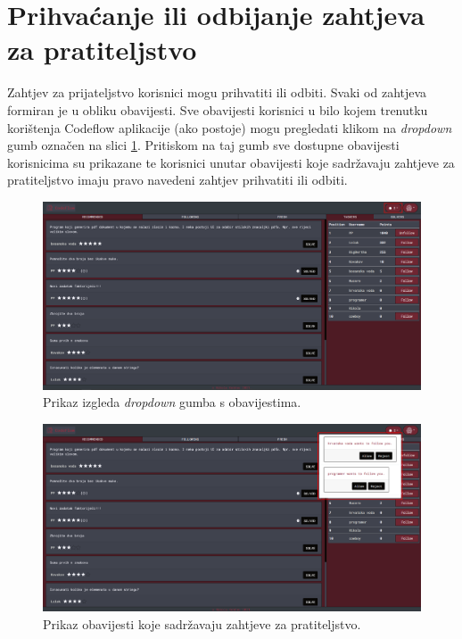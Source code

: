 \documentclass[times, utf8, zavrsni, numeric]{fer}
\begin{document}
		\section{Prihvaćanje ili odbijanje zahtjeva za pratiteljstvo}
		Zahtjev za prijateljstvo korisnici mogu prihvatiti ili odbiti. Svaki od zahtjeva formiran je u obliku obavijesti. Sve obavijesti korisnici u bilo kojem trenutku korištenja Codeflow aplikacije (ako postoje) mogu pregledati klikom na \textit{dropdown} gumb označen na slici \ref{fig:notificationbutton}. Pritiskom na taj gumb sve dostupne obavijesti korisnicima su prikazane te korisnici unutar obavijesti koje sadržavaju zahtjeve za pratiteljstvo imaju pravo navedeni zahtjev prihvatiti ili odbiti.
		\begin{figure}[H]
			\centering
			\includegraphics[width=\linewidth]{pictures/koristenje/GumbZaObavijesti.png}
			\caption{Prikaz izgleda \textit{dropdown} gumba s obavijestima.}
			\label{fig:notificationbutton}
		\end{figure}
		\begin{figure}[H]
			\centering
			\includegraphics[width=\linewidth]{pictures/koristenje/ZahtjevObavijesti.png}
			\caption{Prikaz obavijesti koje sadržavaju zahtjeve za pratiteljstvo.}
			\label{fig:pratiteljstvo}
		\end{figure}
	
\end{document}
